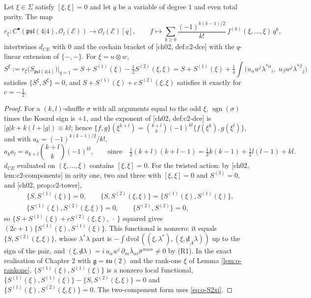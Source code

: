 \begin{lemma}
\label{lem:o-ev}
Let $\xi\in\Sigma$ satisfy $[\xi,\xi]=0$ and let $q$ be a variable of degree $1$ and even total parity. The map
\begin{equation}
r_\xi\colon C^\bullet(\mathfrak{psl}(4|4),\mathscr O_l(\mathscr E))\to\mathscr O_l(\mathscr E)[q],\qquad f\mapsto\sum_{k\ge0}\frac{(-1)^{k(k-1)/2}}{k!}\,f^{(k)}(\xi,\dots,\xi)\,q^k,
\label{eq:o-ev}
\end{equation}
intertwines $d_{CE}$ with $0$ and the cochain bracket of [ch02, def:c2-dce] with the $q$-linear extension of $\{-,-\}$. For $\xi=u\otimes w$,
\begin{equation}
S^\xi:=r_\xi\big(S_{\mathfrak{psl}(4|4)}\big)\big|_{q=1}=S+S^{(1)}(\xi)-\tfrac12S^{(2)}(\xi,\xi)=S+S^{(1)}(\xi)+\tfrac14\int\big(u_\alpha w^i\lambda^{*\alpha}{}_i,\;u_\beta w^j\lambda^{*\beta}{}_j\big)
\label{eq:o-twistaction}
\end{equation}
satisfies $\{S^\xi,S^\xi\}=0$, and $S+S^{(1)}(\xi)+c\,S^{(2)}(\xi,\xi)$ satisfies it exactly for $c=-\tfrac12$.
\end{lemma}

\begin{proof}
For a $(k,l)$-shuffle $\sigma$ with all arguments equal to the odd $\xi$, $\operatorname{sgn}(\sigma)$ times the Koszul sign is $+1$, and the exponent of [ch02, def:c2-dce] is $|g|k+k(l+|g|)\equiv kl$; hence $\{f,g\}(\xi^{k+l})=\binom{k+l}{k}(-1)^{kl}\{f(\xi^k),g(\xi^l)\}$, and with $a_k=(-1)^{k(k-1)/2}/k!$,
\[
a_ka_l=a_{k+l}\binom{k+l}{k}(-1)^{kl},\qquad\text{since}\quad \tfrac12(k+l)(k+l-1)=\tfrac12k(k-1)+\tfrac12l(l-1)+kl .
\]
$d_{CE}$ evaluated on $(\xi,\dots,\xi)$ contains $[\xi,\xi]=0$. For the twisted action: by [ch02, lem:c2-components] in arity one, two and three with $[\xi,\xi]=0$ and $S^{(3)}=0$, and [ch02, prop:c2-tower],
\[
\begin{aligned}
&\{S,S^{(1)}(\xi)\}=0,\qquad \{S,S^{(2)}(\xi,\xi)\}=\{S^{(1)}(\xi),S^{(1)}(\xi)\},\\
&\{S^{(1)}(\xi),S^{(2)}(\xi,\xi)\}=0,\qquad \{S^{(2)},S^{(2)}\}=0,
\end{aligned}
\]
so $\{S+S^{(1)}(\xi)+cS^{(2)}(\xi,\xi),\ \cdot\ \}$ squared gives $(2c+1)\{S^{(1)}(\xi),S^{(1)}(\xi)\}$. This functional is nonzero: it equals $\{S,S^{(2)}(\xi,\xi)\}$, whose $\lambda^*\lambda$ part is $-\int\mathrm{dvol}\,((\xi,\lambda^*),(\xi,{\not d}_A\lambda))$ up to the sign of the pair, and $(\xi,{\not d}\lambda)=i\,u_\alpha w^i\,\partial_m\bar\lambda_{\dot\alpha i}\bar\sigma^{m\dot\alpha\alpha}\neq0$ by (R1). In the exact realisation of Chapter 2 with $\mathfrak g=\mathfrak{su}(2)$ and the rank-one $\xi$ of Lemma \ref{lem:o-rankone}, $\{S^{(1)}(\xi),S^{(1)}(\xi)\}$ is a nonzero local functional, $\{S^{(1)}(\xi),S^{(1)}(\xi)\}-\{S,S^{(2)}(\xi,\xi)\}=0$ and $\{S^{(1)}(\xi),S^{(2)}(\xi,\xi)\}=0$. The two-component form uses \eqref{eq:o-S2xi}.
\end{proof}

